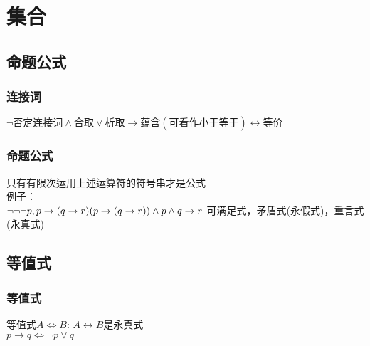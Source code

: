 \documentclass{book}
\begin{document}
\chapter{集合}
\section{命题公式}
\subsection{连接词}
$
\neg 否定连接词
\land 合取
\lor 析取
\to 蕴含(可看作小于等于)
\leftrightarrow 等价
$
\subsection{命题公式}
只有有限次运用上述运算符的符号串才是公式\\
例子：\\
$\neg\neg\neg p,\\
p\to (q\to r)\\
(p\to (q\to r))\land p\land q\to r
$
可满足式，矛盾式(永假式)，重言式(永真式)
\section{等值式}
\subsection{等值式}
等值式$A\Leftrightarrow B$: $A\leftrightarrow B$是永真式\\
$p\to q \Leftrightarrow \neg p \lor q$
\end{document}
